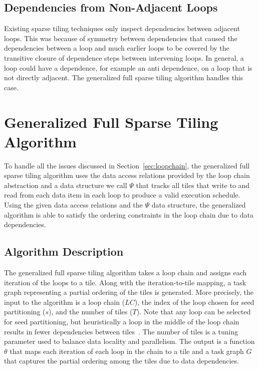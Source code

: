\subsection{Dependencies from Non-Adjacent Loops}
\label{sec:prevloops}

Existing sparse tiling techniques only inspect 
dependencies between adjacent loops.  This was
because of symmetry between dependencies that caused the dependencies
between a loop and much earlier loops to be covered by the transitive closure
of dependence steps between intervening loops.  In general,
a loop could have a dependence, for example an anti dependence,
on a loop that is not directly adjacent.  The generalized full sparse tiling
algorithm handles this case.
  
\section{Generalized Full Sparse Tiling Algorithm}
\label{sec:generalizedFST}
To handle all the issues discussed in Section~\ref{sec:loopchain}, the generalized
full sparse tiling algorithm uses the data access relations provided by the
loop chain abstraction and a data structure we call $\Psi$ that tracks
all tiles that write to and read from each data item in each loop 
to produce a valid execution schedule.
Using the given data access relations and the $\Psi$ data structure, 
the generalized algorithm is able
to satisfy the ordering constraints in the loop chain due to
data dependencies.

%
\subsection{Algorithm Description}
\label{sec:algorithm}
The generalized full sparse tiling algorithm takes a loop chain
and assigns each iteration of the loops to a tile.
Along with the iteration-to-tile mapping, a task graph representing a partial ordering of the tiles is generated.
More precisely, the input to the algorithm is a loop chain ($LC$), 
the index of the loop chosen for seed partitioning ($s$), and the number of tiles ($T$).
Note that any loop can be selected for seed partitioning, but heuristically a loop in the middle
of the loop chain results in fewer dependencies between tiles~\citep{Strout2001poster}.
The number of tiles is a tuning parameter used to balance data locality and parallelism.
The output is a function $\theta$ that maps each iteration of each loop in 
the chain to a tile and a task graph $G$ that captures the
partial ordering among the tiles due to data dependencies.


